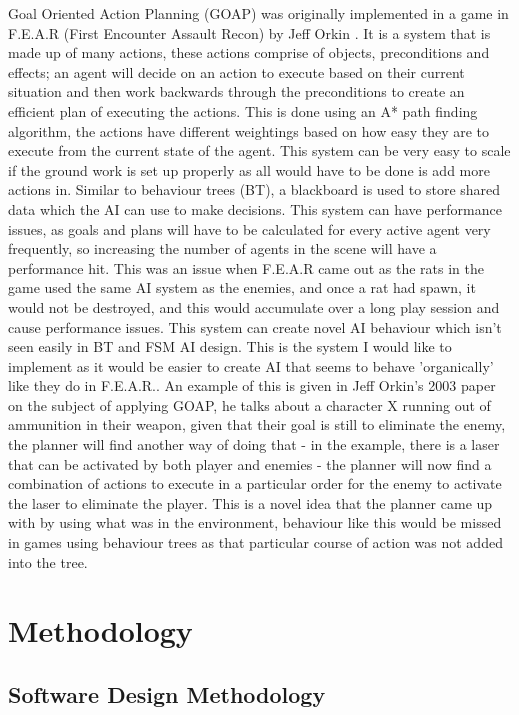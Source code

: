 \documentclass[10pt]{report}
\begin{document}
Goal Oriented Action Planning (GOAP) was originally implemented in a game in F.E.A.R (First Encounter Assault Recon) by Jeff Orkin \cite{goap}. It is a system that is made up of many actions, these actions comprise of objects, preconditions and effects; an agent will decide on an action to execute based on their current situation and then work backwards through the preconditions to create an efficient plan of executing the actions. This is done using an A* path finding algorithm, the actions have different weightings based on how easy they are to execute from the current state of the agent. This system can be very easy to scale if the ground work is set up properly as all would have to be done is add more actions in. Similar to behaviour trees (BT), a blackboard is used to store shared data which the AI can use to make decisions. This system can have performance issues, as goals and plans will have to be calculated for every active agent very frequently, so increasing the number of agents in the scene will have a performance hit. This was an issue when F.E.A.R came out as the rats in the game used the same AI system as the enemies, and once a rat had spawn, it would not be destroyed, and this would accumulate over a long play session and cause performance issues. This system can create novel AI behaviour which isn't seen easily in BT and FSM AI design. This is the system I would like to implement as it would be easier to create AI that seems to behave 'organically' like they do in F.E.A.R.. \cite{goapTommyTompson} An example of this is given in Jeff Orkin's 2003 paper on the subject of applying GOAP\cite{applyingGoap}, he talks about a character X running out of ammunition in their weapon, given that their goal is still to eliminate the enemy, the planner will find another way of doing that - in the example, there is a laser that can be activated by both player and enemies - the planner will now find a combination of actions to execute in a particular order for the enemy to activate the laser to eliminate the player. This is a novel idea that the planner came up with by using what was in the environment, behaviour like this would be missed in games using behaviour trees as that particular course of action was not added into the tree.

\chapter{Methodology}
\section{Software Design Methodology}
\end{document}
